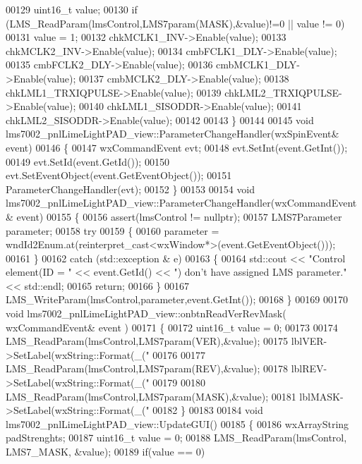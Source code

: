 \begin{DoxyCode}
00129     uint16\_t value;
00130     \textcolor{keywordflow}{if} (LMS_ReadParam(lmsControl,LMS7param(MASK),&value)!=0  || value != 0)
00131          value = 1;
00132     chkMCLK1_INV->Enable(value);
00133     chkMCLK2_INV->Enable(value);
00134     cmbFCLK1_DLY->Enable(value);
00135     cmbFCLK2_DLY->Enable(value);
00136     cmbMCLK1_DLY->Enable(value);
00137     cmbMCLK2_DLY->Enable(value);
00138     chkLML1_TRXIQPULSE->Enable(value);
00139     chkLML2_TRXIQPULSE->Enable(value);
00140     chkLML1_SISODDR->Enable(value);
00141     chkLML2_SISODDR->Enable(value);
00142 
00143 \}
00144 
00145 \textcolor{keywordtype}{void} lms7002_pnlLimeLightPAD_view::ParameterChangeHandler(wxSpinEvent& event)
00146 \{
00147     wxCommandEvent evt;
00148     evt.SetInt(event.GetInt());
00149     evt.SetId(event.GetId());
00150     evt.SetEventObject(event.GetEventObject());
00151     ParameterChangeHandler(evt);
00152 \}
00153 
00154 \textcolor{keywordtype}{void} lms7002_pnlLimeLightPAD_view::ParameterChangeHandler(wxCommandEvent& event)
00155 \{
00156     assert(lmsControl != \textcolor{keyword}{nullptr});
00157     LMS7Parameter parameter;
00158     \textcolor{keywordflow}{try}
00159     \{
00160         parameter = wndId2Enum.at(reinterpret\_cast<wxWindow*>(event.GetEventObject()));
00161     \}
00162     \textcolor{keywordflow}{catch} (std::exception & e)
00163     \{
00164         std::cout << \textcolor{stringliteral}{"Control element(ID = "} << \textcolor{keyword}{event}.GetId() << \textcolor{stringliteral}{") don't have assigned LMS parameter."} << 
      std::endl;
00165         \textcolor{keywordflow}{return};
00166     \}
00167     LMS_WriteParam(lmsControl,parameter,event.GetInt());
00168 \}
00169 
00170 \textcolor{keywordtype}{void} lms7002_pnlLimeLightPAD_view::onbtnReadVerRevMask( wxCommandEvent& event )
00171 \{
00172     uint16\_t value = 0;
00173 
00174     LMS_ReadParam(lmsControl,LMS7param(VER),&value);
00175     lblVER->SetLabel(wxString::Format(\_(\textcolor{stringliteral}{"%
00176 
00177     LMS_ReadParam(lmsControl,LMS7param(REV),&value);
00178     lblREV->SetLabel(wxString::Format(\_(\textcolor{stringliteral}{"%
00179 
00180     LMS_ReadParam(lmsControl,LMS7param(MASK),&value);
00181     lblMASK->SetLabel(wxString::Format(\_(\textcolor{stringliteral}{"%
00182 \}
00183 
00184 \textcolor{keywordtype}{void} lms7002_pnlLimeLightPAD_view::UpdateGUI()
00185 \{
00186     wxArrayString padStrenghts;
00187     uint16\_t value = 0;
00188     LMS_ReadParam(lmsControl, LMS7_MASK, &value);
00189     \textcolor{keywordflow}{if}(value == 0)
}}}
\end{DoxyCode}
